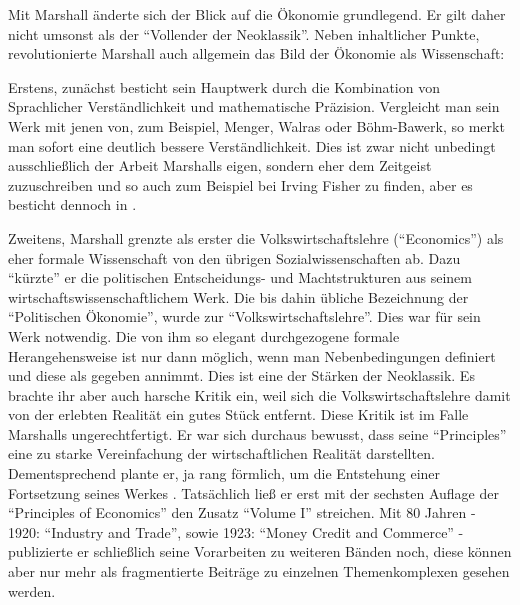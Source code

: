 Mit Marshall änderte sich der Blick auf die Ökonomie grundlegend. Er gilt daher nicht umsonst als der "`Vollender der Neoklassik"'.  Neben inhaltlicher Punkte, revolutionierte Marshall auch allgemein das Bild der Ökonomie als Wissenschaft:

Erstens, zunächst besticht sein Hauptwerk durch die Kombination von Sprachlicher Verständlichkeit und mathematische Präzision. Vergleicht man sein Werk mit jenen von, zum Beispiel, Menger, Walras oder Böhm-Bawerk, so merkt man sofort eine deutlich bessere Verständlichkeit. Dies ist zwar nicht unbedingt ausschließlich der Arbeit Marshalls eigen, sondern eher dem Zeitgeist zuzuschreiben und so auch zum Beispiel bei Irving Fisher zu finden, aber es besticht dennoch in \textcite{Marshall1890}. 

Zweitens, Marshall grenzte als erster die Volkswirtschaftslehre ("`Economics"') als eher formale Wissenschaft von den übrigen Sozialwissenschaften ab. Dazu "`kürzte"' er die politischen Entscheidungs- und Machtstrukturen aus seinem wirtschaftswissenschaftlichem Werk. Die bis dahin übliche Bezeichnung der "`Politischen Ökonomie"', wurde zur "`Volkswirtschaftslehre"'. Dies war für sein Werk notwendig. Die von ihm so elegant durchgezogene formale Herangehensweise ist nur dann möglich, wenn man Nebenbedingungen definiert und diese als gegeben annimmt. Dies ist eine der Stärken der Neoklassik. Es brachte ihr aber auch harsche Kritik ein, weil sich die Volkswirtschaftslehre damit von der erlebten Realität ein gutes Stück entfernt. Diese Kritik ist im Falle Marshalls ungerechtfertigt. Er war sich durchaus bewusst, dass seine "`Principles"' eine zu starke Vereinfachung der wirtschaftlichen Realität darstellten. Dementsprechend plante er, ja rang förmlich, um die Entstehung einer Fortsetzung seines Werkes \parencite[S. 146]{Rieter1989}. Tatsächlich ließ er erst mit der sechsten Auflage der "`Principles of Economics"' den Zusatz "`Volume I"' streichen. Mit 80 Jahren - 1920: "`Industry and Trade"', sowie 1923: "`Money Credit and Commerce"' - publizierte er schließlich seine Vorarbeiten zu weiteren Bänden noch, diese können aber nur mehr als fragmentierte Beiträge zu einzelnen Themenkomplexen gesehen werden.

